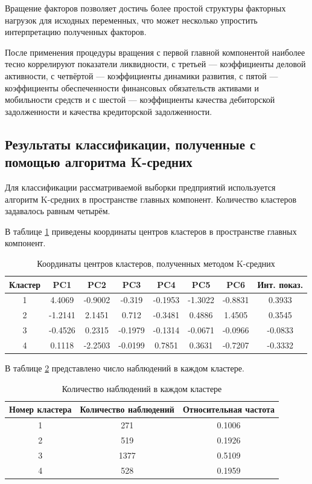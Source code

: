 \documentclass[14pt,a4paper]{extarticle}
\begin{document}
Вращение факторов позволяет достичь более простой структуры факторных нагрузок для исходных 
переменных, что может несколько упростить интерпретацию полученных факторов.

После применения процедуры вращения с первой главной компонентой наиболее тесно коррелируют 
показатели ликвидности, 
с третьей --- коэффициенты деловой активности, 
с четвёртой --- коэффициенты динамики развития, 
с пятой --- коэффициенты обеспеченности финансовых обязательств активами и мобильности средств
и с шестой --- коэффициенты качества дебиторской задолженности и 
качества кредиторской задолженности.

\subsection{Результаты классификации, полученные с помощью алгоритма K-средних}

Для классификации рассматриваемой выборки предприятий используется алгоритм K-средних в 
пространстве главных компонент. Количество кластеров задавалось равным четырём.

В таблице \ref{tab:kmeans_centers} приведены координаты центров кластеров в пространстве 
главных компонент.

\begin{table}[H]
    \centering
    \caption{Координаты центров кластеров, полученных методом K-средних}
    \label{tab:kmeans_centers}
    \begin{tabular}{c|cccccc|c}
        \toprule
        Кластер & PC1 & PC2 & PC3 & PC4 & PC5 & PC6 & Инт. показ.\\
        \midrule
        1 & 4.4069 & -0.9002 & -0.319 & -0.1953 & -1.3022 & -0.8831 & 0.3933 \\
        2 & -1.2141 & 2.1451 & 0.712 & -0.3481 & 0.4886 & 1.4505 & 0.3545\\
        3 & -0.4526 & 0.2315 & -0.1979 & -0.1314 & -0.0671 & -0.0966 & -0.0833\\
        4 & 0.1118 & -2.2503 & -0.0199 & 0.7851 & 0.3631 & -0.7207 & -0.3332\\
        \bottomrule
    \end{tabular}
\end{table}

В таблице \ref{tab:counts} представлено число наблюдений в каждом кластере.

\begin{table}[H]
    \centering
    \caption{Количество наблюдений в каждом кластере}
    \label{tab:counts}
    \begin{tabular}{ccc}
        \toprule
        Номер кластера & Количество наблюдений & Относительная частота \\
        \midrule
        1 & 271 & 0.1006 \\
        2 & 519 & 0.1926 \\
        3 & 1377 & 0.5109 \\
        4 & 528 & 0.1959 \\
        \bottomrule
    \end{tabular}
\end{table}
\end{document}
